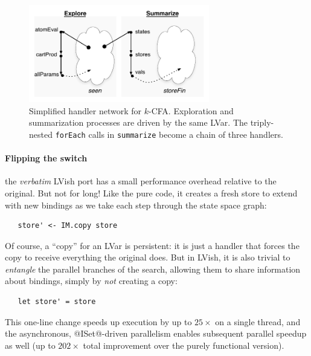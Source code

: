 \begin{figure}
\vspace{-4mm}
\begin{center}
  \includegraphics[width=3.1in]{figures/DataFlowNet.pdf}
\end{center}
\vspace{-4mm}
  \caption{Simplified handler network for $k$-CFA.  Exploration and
    summarization processes are driven by the same LVar.  The triply-nested
    \lstinline{forEach} calls in \lstinline{summarize} become a chain of three handlers.}
\vspace{-4mm}
  \label{fig:dataflow}
\end{figure}


\paragraph{Flipping the switch}

 the {\em verbatim} LVish port has a small performance overhead relative to the
 original.  But not for long!
  Like the
pure code, it creates a fresh store to extend with new bindings as we take each
step through the state space graph:
\begin{lstlisting}
   store' <- IM.copy store 
\end{lstlisting}
Of course, a ``copy'' for an LVar is persistent: it is just a handler that
forces the copy to receive everything the original does.  But in LVish, it is
also trivial to {\em entangle} the parallel branches of the search, allowing them to
share information about bindings, simply by {\em not} creating a copy:
\begin{lstlisting}
   let store' = store 
\end{lstlisting}
This one-line change speeds up execution by up to $25\times$ on a single thread, and the
asynchronous, @ISet@-driven parallelism enables subsequent parallel speedup as well
(up to $202\times$ total improvement over the purely functional version).

